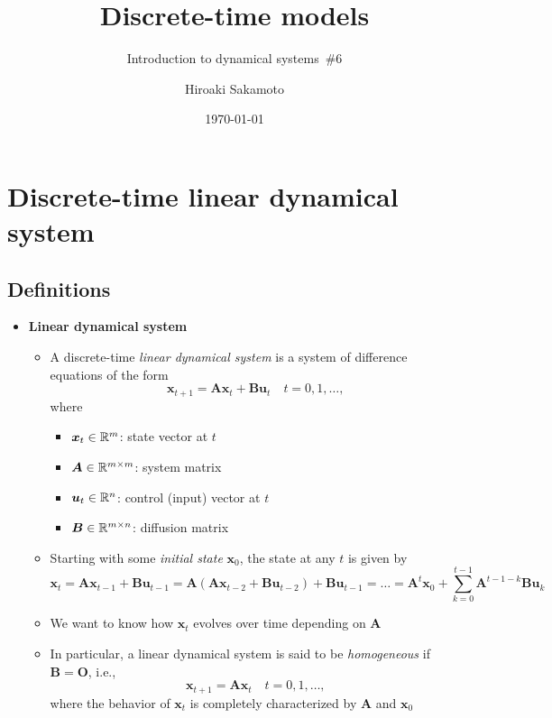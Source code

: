 \documentclass[12pt,a4paper]{article}
\title{Discrete-time models}
\subtitle{Introduction to dynamical systems~\#6}
\author{Hiroaki Sakamoto}
\date{\today}
\begin{document}
\maketitle
\tableofcontents

\section{Discrete-time linear dynamical system}

\subsection{Definitions}

\begin{itemize}

\item \textbf{Linear dynamical system}
  \begin{itemize}
  \item A discrete-time \emph{linear dynamical system} is a system of difference equations of the form
    \begin{equation}\nonumber%
      \bm{x}_{t+1} = \bm{A}\bm{x}_{t} + \bm{B}\bm{u}_{t}
      \quad t = 0, 1, \ldots,
    \end{equation}
    where
    \begin{itemize}
    \item $\bm{x}_{t}\in \mathbb{R}^{m}$: state vector at $t$
    \item $\bm{A}\in \mathbb{R}^{m\times m}$: system matrix
    \item $\bm{u}_{t}\in \mathbb{R}^{n}$: control (input) vector at $t$
    \item $\bm{B} \in \mathbb{R}^{m\times n}$: diffusion matrix
    \end{itemize}
  \item Starting with some \emph{initial state} $\bm{x}_{0}$,
    the state at any $t$ is given by
    \begin{equation}\nonumber%
      \bm{x}_{t}
      = \bm{A}\bm{x}_{t-1} + \bm{B}\bm{u}_{t-1}
      = \bm{A}(\bm{A}\bm{x}_{t-2} + \bm{B}\bm{u}_{t-2}) + \bm{B}\bm{u}_{t-1}
      =
      \ldots
      = \bm{A}^{t}\bm{x}_{0} + \sum_{k=0}^{t-1}\bm{A}^{t-1-k}\bm{B}\bm{u}_{k}
    \end{equation}
  \item We want to know how $\bm{x}_{t}$ evolves over time depending on $\bm{A}$
  \item In particular, a linear dynamical system is said to be \emph{homogeneous} if $\bm{B}=\bm{O}$, i.e.,
    \begin{equation}\nonumber%
      \bm{x}_{t+1} = \bm{A}\bm{x}_{t}
      \quad t = 0, 1, \ldots,
    \end{equation}
    where the behavior of $\bm{x}_{t}$ is completely characterized by $\bm{A}$ and $\bm{x}_{0}$
  \end{itemize}


\end{itemize}
\end{document}
